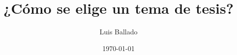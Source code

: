 \documentclass[
	11pt, %
]{beamer}
\title[SEMINARIO DE INVESTIGACIÓN I]{¿Cómo se elige un tema de tesis?} %
\author[Luis Ballado]{Luis Ballado} %
\institute[CINVESTAV]{CINVESTAV - UNIDAD TAMAULIPAS \\ \smallskip \textit{luis.ballado@cinvestav.mx}} %
\date[\today]{\today} %
\begin{document}

\begin{frame}
	\titlepage %
\end{frame}



	


\end{document}
